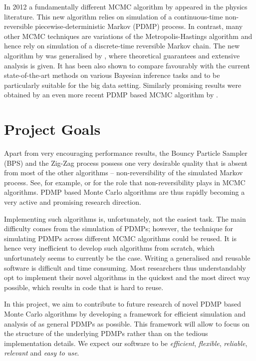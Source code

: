 \documentclass[report.tex]{subfiles}
\begin{document}
In 2012 a fundamentally different MCMC algorithm by \citet{peters2012rejection}
appeared in the physics literature. This new algorithm relies on simulation of
a continuous-time non-reversible piecewise-deterministic Markov (PDMP) process. In
contrast, many other MCMC techniques are variations of the
Metropolis-Hastings algorithm and hence rely on simulation of a discrete-time
reversible Markov chain.
The new algorithm by \citet{peters2012rejection}
was generalised by \citet{bouchard2015bouncy},
where theoretical guarantees and extensive analysis is given.
It has been also shown to compare favourably with the current
state-of-the-art methods on various Bayesian inference tasks and to be
particularly suitable for the big data setting.
Similarly promising results were obtained by an even more recent PDMP based
MCMC algorithm by \citet{bierkens2016zig}.

\section{Project Goals}
\label{project-goals-section}

Apart from very encouraging performance results, the Bouncy Particle Sampler (BPS)
\cite{peters2012rejection, bouchard2015bouncy}
and the Zig-Zag process \cite{bierkens2016zig}
possess one very desirable quality that is absent from most of the other algorithms --
non-reversibility of the simulated Markov process.
See, for example, \citet{neal2004improving} or \citet{sun2010improving} for the role
that non-reversibility plays in MCMC algorithms.
PDMP based Monte Carlo algorithms are thus rapidly becoming a very active and promising
research direction.

Implementing such algorithms is, unfortunately, not the easiest task.
The main difficulty comes from the simulation of
PDMPs; however, the technique for simulating PDMPs across different MCMC algorithms
could be reused.
It is hence very inefficient to develop such algorithms from
scratch, which unfortunately seems to currently be the case.
Writing a generalised and
reusable software is difficult and time consuming.
Most researchers thus understandably opt to implement their novel algorithms in
the quickest and the most direct way possible, which results in code that is
hard to reuse.

In this project, we aim to contribute to future research of
novel PDMP based Monte Carlo algorithms by developing a framework for efficient
simulation and analysis of as general PDMPs as possible.
This framework will allow to focus on the structure of the underlying PDMPs rather
than on the tedious implementation details.
We expect our software to be \textit{efficient}, \textit{flexible},
\textit{reliable}, \textit{relevant} and \textit{easy to use}.
\end{document}
